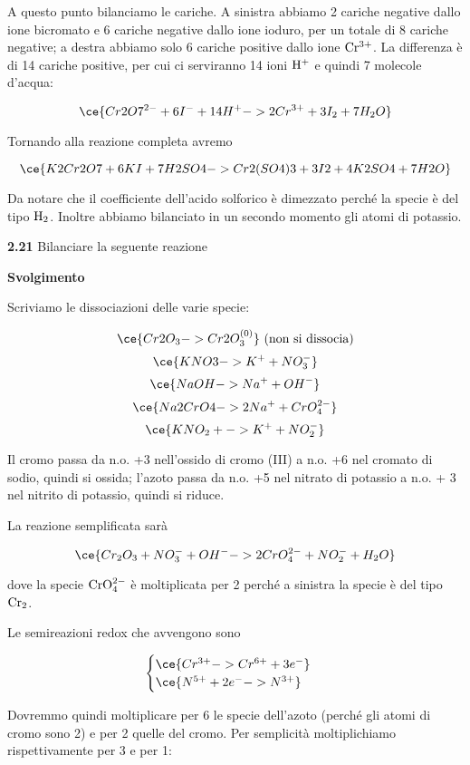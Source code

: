 A questo punto bilanciamo le cariche. A sinistra abbiamo 2 cariche negative dallo ione bicromato e 6 cariche negative dallo ione ioduro, per un totale di 8 cariche negative; a destra abbiamo solo 6 cariche positive dallo ione $\rm Cr^{3+}$. La differenza è di 14 cariche positive, per cui ci serviranno 14 ioni $\rm H^+$ e quindi 7 molecole d'acqua:

$$\ce{Cr2O7^{2-} + 6I^- + 14H^+ -> 2Cr^{3+} + 3I_2 + 7H_2O}$$

Tornando alla reazione completa avremo

$$\ce{K2Cr2O7 + 6KI + 7H2SO4 -> Cr2(SO4)3 + 3I2 + 4K2SO4 + 7H2O}$$

Da notare che il coefficiente dell'acido solforico è dimezzato perché la specie è del tipo $\rm H_2$. Inoltre abbiamo bilanciato in un secondo momento gli atomi di potassio.

\vspace{0.2cm}\textbf{2.21} Bilanciare la seguente reazione

\begin{center}
\end{center}

\large\textbf{Svolgimento}\normalsize

Scriviamo le dissociazioni delle varie specie:

$$\ce{Cr2O_3 -> Cr2O_3^{(0)}} \text{ (non si dissocia)}$$
$$\ce{KNO3 -> K^+ + NO_3^-}$$
$$\ce{NaOH -> Na^+ + OH^-}$$
$$\ce{Na2CrO4 -> 2Na^+ + CrO_4^{2-}}$$
$$\ce{KNO_2 + -> K^+ + NO_2^-}$$

Il cromo passa da n.o. +3 nell'ossido di cromo (III) a n.o. +6 nel cromato di sodio, quindi si ossida; l'azoto passa da n.o. +5 nel nitrato di potassio a n.o. + 3 nel nitrito di potassio, quindi si riduce.

La reazione semplificata sarà

$$\ce{Cr_2O_3 + NO_3^- + OH^- -> 2CrO_4^{2-} + NO_2^- + H_2O}$$

dove la specie $\rm CrO_4^{2-}$ è moltiplicata per 2 perché a sinistra la specie è del tipo $\rm Cr_2$.

Le semireazioni redox che avvengono sono

$$\begin{cases}
    \ce{Cr^{3+} -> Cr^{6+} + 3e^-}\\
    \ce{N^{5+} + 2e^- -> N^{3+}}
\end{cases}$$

Dovremmo quindi moltiplicare per 6 le specie dell'azoto (perché gli atomi di cromo sono 2) e per 2 quelle del cromo. Per semplicità moltiplichiamo rispettivamente per 3 e per 1:

